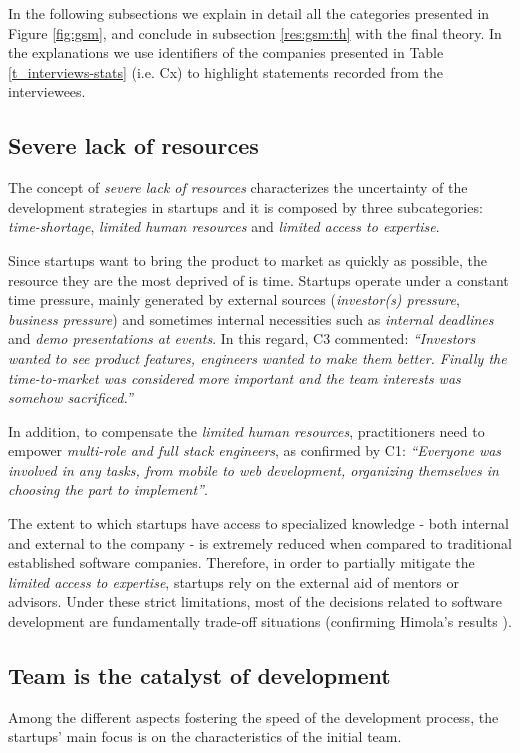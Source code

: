 \documentclass[10pt,journal,letterpaper,compsoc]{IEEEtran}
\begin{document}
In the following subsections we explain in detail all the categories presented 
in Figure \ref{fig:gsm}, and conclude in subsection \ref{res:gsm:th} with the 
final theory. In the explanations we use identifiers of the companies presented 
in Table \ref{t_interviews-stats} (i.e. Cx) to highlight statements recorded 
from the interviewees.

\subsection{Severe lack of resources}
\label{res:gsm:cat7}
The concept of \textit{severe lack of resources} characterizes the uncertainty 
of the development strategies in startups and it is composed by three 
subcategories: \textit{time-shortage}, \textit{limited human resources} and 
\textit{limited access to expertise}.


Since startups want to bring the product to market as quickly as possible, the 
resource they are the most deprived of is time. Startups operate under a 
constant time pressure, mainly generated by external sources 
(\textit{investor(s) pressure}, \textit{business pressure}) and sometimes 
internal necessities such as \textit{internal deadlines} and \textit{demo 
presentations at events}. In this regard, C3 commented: \textit{``Investors 
wanted to see product features, engineers wanted to make them better. Finally 
the time-to-market was considered more important and the team interests was 
somehow sacrificed.''}

In addition, to compensate the \textit{limited human resources},  practitioners 
need to empower \textit{multi-role and full stack engineers}, as confirmed by 
C1: \textit{``Everyone was involved in any tasks, from mobile to web 
development, organizing themselves in choosing the part to implement''}.

The extent to which startups have access to specialized knowledge - both 
internal and external to the company - is extremely reduced when compared to 
traditional established software companies. Therefore, in order to partially 
mitigate the \textit{limited access to expertise}, startups rely on the external 
aid of mentors or advisors. Under these strict limitations, most of the 
decisions related to software development are fundamentally trade-off 
situations (confirming Himola's results \cite{Hilmola2003}).
\subsection{Team is the catalyst of development}
\label{res:gsm:cat4}
Among the different aspects fostering the speed of the development process, the 
startups' main focus is on the characteristics of the initial team.
\end{document}
